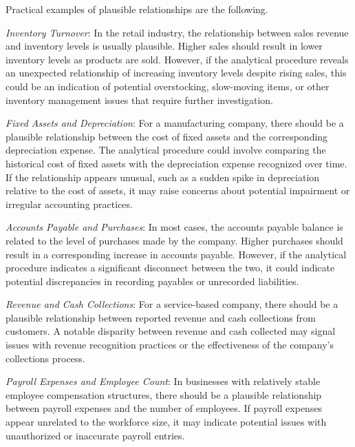 \bigskip
\noindent Practical examples of plausible relationships are the following.

\begin{compactitem}
\item \textit{Inventory Turnover}: In the retail industry, the relationship between sales revenue and inventory levels is usually plausible. Higher sales should result in lower inventory levels as products are sold. However, if the analytical procedure reveals an unexpected relationship of increasing inventory levels despite rising sales, this could be an indication of potential overstocking, slow-moving items, or other inventory management issues that require further investigation.
\item \textit{Fixed Assets and Depreciation}: For a manufacturing company, there should be a plausible relationship between the cost of fixed assets and the corresponding depreciation expense. The analytical procedure could involve comparing the historical cost of fixed assets with the depreciation expense recognized over time. If the relationship appears unusual, such as a sudden spike in depreciation relative to the cost of assets, it may raise concerns about potential impairment or irregular accounting practices.
\item \textit{Accounts Payable and Purchases}: In most cases, the accounts payable balance is related to the level of purchases made by the company. Higher purchases should result in a corresponding increase in accounts payable. However, if the analytical procedure indicates a significant disconnect between the two, it could indicate potential discrepancies in recording payables or unrecorded liabilities.
\item \textit{Revenue and Cash Collections}: For a service-based company, there should be a plausible relationship between reported revenue and cash collections from customers. A notable disparity between revenue and cash collected may signal issues with revenue recognition practices or the effectiveness of the company's collections process.
\item \textit{Payroll Expenses and Employee Count}: In businesses with relatively stable employee compensation structures, there should be a plausible relationship between payroll expenses and the number of employees. If payroll expenses appear unrelated to the workforce size, it may indicate potential issues with unauthorized or inaccurate payroll entries.
\end{compactitem}

